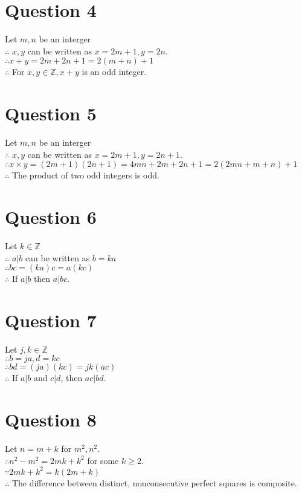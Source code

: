 \documentclass[11pt, oneside]{article}   	%
\begin{document}
\section*{Question 4}

   Let $m,n$ be an interger\\
   $\therefore$ $x, y$ can be written as $x=2m+1, y=2n$.\\
   $\therefore x+y=2m+2n+1=2(m+n)+1$\\
   $\therefore$ For $x,y\in \mathbb{Z}, x+y$ is an odd integer.

\section*{Question 5}

   Let $m,n$ be an interger\\
   $\therefore$ $x, y$ can be written as $x=2m+1, y=2n+1$.\\
   $\therefore x\times y=(2m+1)(2n+1)=4mn+2m+2n+1=2(2mn+m+n)+1$\\
   $\therefore$ The product of two odd integers is odd.

\section*{Question 6}

   Let $k\in \mathbb{Z} $\\
   $\therefore$ $a|b$ can be written as $b=ka$\\
   $\therefore bc=(ka)c=a(kc)$\\
   $\therefore$ If $a|b$ then $a|bc$.\\

\section*{Question 7}

   Let $j,k\in \mathbb{Z} $\\
   $\therefore b=ja, d=kc$\\
   $\therefore bd=(ja)(kc)=jk(ac)$\\
   $\therefore$ If $a|b$ and $c|d$, then $ac|bd$.

\section*{Question 8}

   Let $n=m+k$ for $m^{2}, n^{2}$.\\
   $\therefore n^{2}-m^{2}=2mk+k^{2}$ for some $k\geqslant 2$.\\
   $\because 2mk+k^{2}=k(2m+k)$\\
   $\therefore$ The difference between distinct, nonconsecutive perfect squares is composite.
\end{document}
